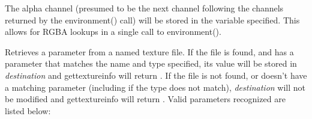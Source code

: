 \documentclass[11pt,letterpaper]{book}
\begin{document}
\vspace{12pt}
The alpha channel (presumed to be the next channel following the
channels returned by the {\cf environment()} call) will be stored in the
variable specified.  This allows for RGBA lookups in a single call to
{\cf environment()}.
\apiend
\vspace{-16pt}

\apiend


\newpage
{}

Retrieves a parameter from a named texture file.  If the file is found,
and has a parameter that matches the name and type specified, its value
will be stored in \emph{destination} and {\cf gettextureinfo} will
return {}.  If the file is not found, or doesn't have a matching
parameter (including if the type does not match), \emph{destination}
will not be modified and {\cf gettextureinfo} will return {}.  Valid
parameters recognized are listed below:

\smallskip
\end{document}
